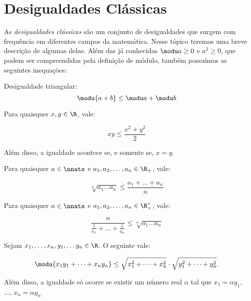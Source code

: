 \section{Desigualdades Clássicas}

As \emph{desigualdades clássicas} são um conjunto de desigualdades que surgem com frequência em diferentes campos da matemática. Nesse tópico teremos uma breve descrição de algumas delas. Além das já conhecidas $\modu a \ge 0$ e $a^2 \ge 0$, que podem ser compreendidas pela definição de módulo, também possuímos as seguintes inequações: 

\begin{theorem}
    Desigualdade triangular:
    \begin{equation*}
        \modu {a+b} \le \modu a + \modu b
    \end{equation*}
\end{theorem}

\begin{theorem}
    Para quaisquer $x, y \in \R$, vale:

    \begin{equation*}
        xy \le \frac {x^2 +y^2} 2
    \end{equation*}

    Além disso, a igualdade acontece se, e somente se, $x=y$.
\end{theorem}

\begin{theorem}
    Para quaisquer $n \in \nnats$ e $a_1, a_2, \dots , a_n \in \R_+$, vale:
    
    \begin{equation*}
        \sqrt[n]{a_1\dots a_n} \leq \frac {a_1 + \dots + a_n} n
    \end{equation*}
\end{theorem}

\begin{theorem}
    Para quaisquer $n \in \nnats$ e $a_1, a_2, \dots , a_n \in \R_+^*$, vale:
    
    \begin{equation*}
        \frac n {\frac 1 {a_1} + \dots + \frac 1 {a_n}}  \leq \sqrt[n]{a_1\dots a_n}  
    \end{equation*}
\end{theorem}

\begin{theorem}
    Sejam $x_1, \dots , x_n, y_1, \dots y_n \in \R$. O seguinte vale:
    
    \begin{equation*}
        \modu{x_1y_1 + \dots + x_ny_n} \leq \sqrt{x^2_1+ \dots + x^2_n}
        \cdot \sqrt{y^2_1+ \dots + y^2_n}.
    \end{equation*}

    Além disso, a igualdade só ocorre se existir um número real $\alpha$ tal que $x_1 = \alpha y_1$, ..., $x_n = \alpha y_n$.
\end{theorem}